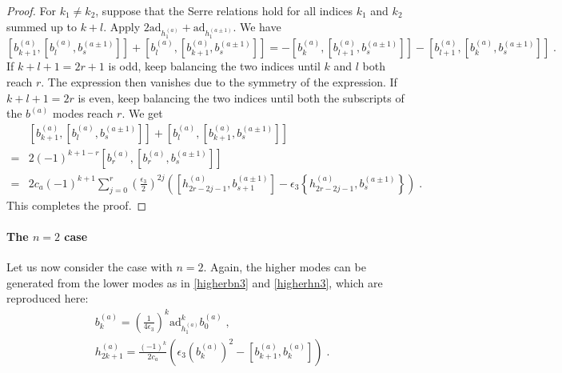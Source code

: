 \documentclass[11pt]{article}
\numberwithin{equation}{section}
\numberwithin{figure}{section}
\numberwithin{table}{section}
\begin{document}
\begin{proof}
For $k_1\neq k_2$, suppose that the Serre relations hold for all indices $k_1$ and $k_2$ summed up to $k+l$. Apply $2\mathrm{ad}_{h^{(a)}_1}+\mathrm{ad}_{h^{(a\pm1)}_1}$. We have
\begin{equation}
	\left[b^{(a)}_{k+1},\left[b^{(a)}_l,b^{(a\pm1)}_s\right]\right]+\left[b^{(a)}_l,\left[b^{(a)}_{k+1},b^{(a\pm1)}_s\right]\right]=-\left[b^{(a)}_k,\left[b^{(a)}_{l+1},b^{(a\pm1)}_s\right]\right]-\left[b^{(a)}_{l+1},\left[b^{(a)}_k,b^{(a\pm1)}_s\right]\right]\;.
\end{equation}
If $k+l+1=2r+1$ is odd, keep balancing the two indices until $k$ and $l$ both reach $r$. The expression then vanishes due to the symmetry of the expression. If $k+l+1=2r$ is even, keep balancing the two indices until both the subscripts of the $b^{(a)}$ modes reach $r$. We get
\begin{align}
	&\left[b^{(a)}_{k+1},\left[b^{(a)}_l,b^{(a\pm1)}_s\right]\right]+\left[b^{(a)}_l,\left[b^{(a)}_{k+1},b^{(a\pm1)}_s\right]\right]\nonumber\\
	=&2(-1)^{k+1-r}\left[b^{(a)}_r,\left[b^{(a)}_r,b^{(a\pm1)}_s\right]\right]\nonumber\\
	=&2c_a(-1)^{k+1}\sum_{j=0}^r\left(\frac{\epsilon_3}{2}\right)^{2j}\left(\left[h^{(a)}_{2r-2j-1},b^{(a\pm1)}_{s+1}\right]-\epsilon_3\left\{h^{(a)}_{2r-2j-1},b^{(a\pm1)}_s\right\}\right)\;.
\end{align}
This completes the proof.
\end{proof}

\paragraph{The \texorpdfstring{$n=2$}{n=2} case} Let us now consider the case with $n=2$. Again, the higher modes can be generated from the lower modes as in \eqref{higherbn3} and \eqref{higherhn3}, which are reproduced here:
\begin{subequations}
	\begin{align}
		&b^{(a)}_k=\left(\frac{1}{4\epsilon_3}\right)^k\mathrm{ad}_{h^{(a)}_1}^kb^{(a)}_0\;,\label{higherbn2}\\
		&h^{(a)}_{2k+1}=\frac{(-1)^k}{2c_a}\left(\epsilon_3\left(b^{(a)}_k\right)^2-\left[b^{(a)}_{k+1},b^{(a)}_k\right]\right)\label{higherhn2}\;.
	\end{align}
\end{subequations}
\end{document}
